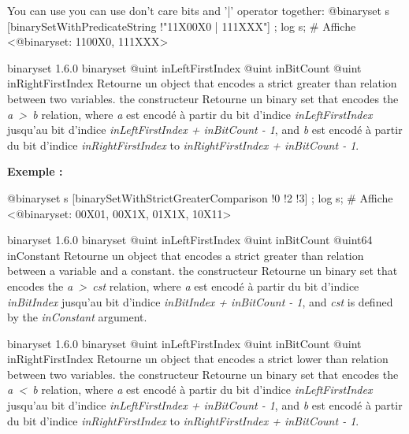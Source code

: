 \begin{galgascode}
You can use you can use don't care bits and '|' operator together:
@binaryset s [binarySetWithPredicateString !"11X00X0 | 111XXX"] ;
log s; # Affiche <@binaryset: 1100X0, 111XXX>
\end{galgascode}





{binaryset}
{1.6.0}
{binaryset}
{@uint inLeftFirstIndex}
{@uint inBitCount}
{@uint inRightFirstIndex}
{Retourne un  object that encodes a strict greater than relation between two variables.}
{the constructeur Retourne un binary set that encodes the \emph{a~>~b} relation, where \emph{a} est encodé à partir du bit d'indice \emph{inLeftFirstIndex} jusqu'au bit d'indice \emph{inLeftFirstIndex  + inBitCount - 1}, and \emph{b} est encodé à partir du bit d'indice \emph{inRightFirstIndex} to \emph{inRightFirstIndex + inBitCount - 1}.}

\textbf{Exemple :}
\begin{galgascode}
@binaryset s [binarySetWithStrictGreaterComparison !0 !2 !3] ;
log s; # Affiche <@binaryset: 00X01, 00X1X, 01X1X, 10X11>
\end{galgascode}





{binaryset}
{1.6.0}
{binaryset}
{@uint inLeftFirstIndex}
{@uint inBitCount}
{@uint64 inConstant}
{Retourne un  object that encodes a strict greater than relation between a variable and a constant.}
{the constructeur Retourne un binary set that encodes the \emph{a~>~cst} relation, where \emph {a} est encodé à partir du bit d'indice \emph{inBitIndex} jusqu'au bit d'indice \emph{inBitIndex  + inBitCount - 1}, and \emph{cst} is defined by the \emph{inConstant} argument.}





{binaryset}
{1.6.0}
{binaryset}
{@uint inLeftFirstIndex}
{@uint inBitCount}
{@uint inRightFirstIndex}
{Retourne un  object that encodes a strict lower than relation between two variables.}
{the constructeur Retourne un binary set that encodes the \emph{a~<~b} relation, where \emph{a} est encodé à partir du bit d'indice \emph{inLeftFirstIndex} jusqu'au bit d'indice \emph{inLeftFirstIndex  + inBitCount - 1}, and \emph{b} est encodé à partir du bit d'indice \emph{inRightFirstIndex} to \emph{inRightFirstIndex + inBitCount - 1}.}

